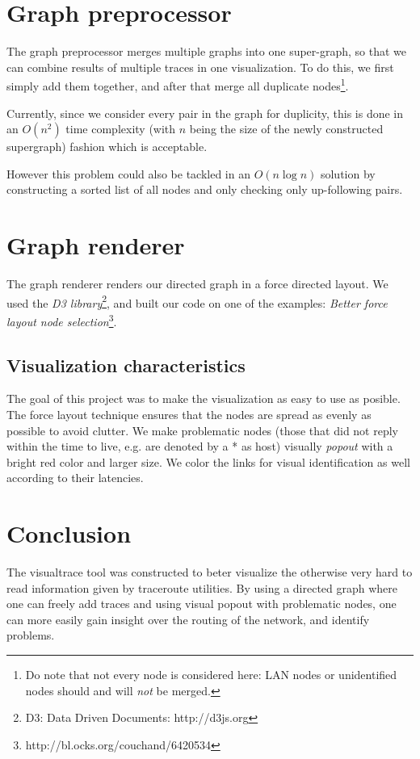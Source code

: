 \documentclass[a4paper,10pt]{article}
\begin{document}
\section{Graph preprocessor}
The graph preprocessor merges multiple graphs into one super-graph, so that we can combine results of multiple traces in one visualization. To do this, we first simply add them together, and after that merge all duplicate nodes\footnote{Do note that not every node is considered here: LAN nodes or unidentified nodes should and will \emph{not} be merged.}.

Currently, since we consider every pair in the graph for duplicity, this is done in an $O(n^2)$ time complexity (with $n$ being the size of the newly constructed supergraph) fashion which is acceptable.

However this problem could also be tackled in an $O(n \log n)$ solution by constructing a sorted list of all nodes and only checking only up-following pairs.

\section{Graph renderer}
The graph renderer renders our directed graph in a force directed layout. We used the \emph{D3 library}\footnote{D3: Data Driven Documents: http://d3js.org}, and built our code on one of the examples: \emph{Better force layout node selection}\footnote{http://bl.ocks.org/couchand/6420534}. 

\subsection{Visualization characteristics}
The goal of this project was to make the visualization as easy to use as posible. The force layout technique ensures that the nodes are spread as evenly as possible to avoid clutter. We make problematic nodes (those that did not reply within the time to live, e.g. are denoted by a * as host) visually \emph{popout} with a bright red color and larger size. We color the links for visual identification as well according to their latencies.

\section{Conclusion}
The visualtrace tool was constructed to beter visualize the otherwise very hard to read information given by traceroute utilities. By using a directed graph where one can freely add traces and using visual popout with problematic nodes, one can more easily gain insight over the routing of the network, and identify problems.
\end{document}
